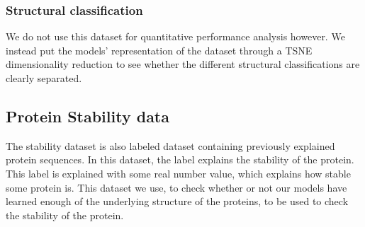 \subsubsection{Structural classification}
We do not use this dataset for quantitative performance analysis however. We instead put the models' representation of the dataset through a TSNE dimensionality reduction to see whether the different structural classifications are clearly separated. 

\subsection{Protein Stability data}
The stability dataset is also labeled dataset containing previously explained protein sequences. In this dataset, the label explains the stability of the protein. This label is explained with some real number value, which explains how stable some protein is. This dataset we use, to check whether or not our models have learned enough of the underlying structure of the proteins, to be used to check the stability of the protein.